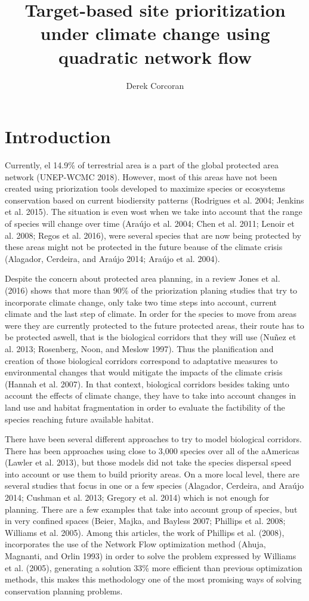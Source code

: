 \documentclass[]{article}
\title{Target-based site prioritization under climate change using quadratic network flow}
\author{Derek Corcoran}
\date{}
\begin{document}
\maketitle

\hypertarget{introduction}{%
\section{Introduction}\label{introduction}}

Currently, el 14.9\% of terrestrial area is a part of the global protected area network (UNEP-WCMC 2018). However, most of this areas have not been created using priorization tools developed to maximize species or ecosystems conservation based on current biodiersity patterns (Rodrigues et al. 2004; Jenkins et al. 2015). The situation is even wost when we take into account that the range of species will change over time (Araújo et al. 2004; Chen et al. 2011; Lenoir et al. 2008; Regos et al. 2016), were several species that are now being protected by these areas might not be protected in the future beause of the climate crisis (Alagador, Cerdeira, and Araújo 2014; Araújo et al. 2004).

Despite the concern about protected area planning, in a review Jones et al. (2016) shows that more than 90\% of the priorization planing studies that try to incorporate climate change, only take two time steps into account, current climate and the last step of climate. In order for the species to move from areas were they are currently protected to the future protected areas, their route has to be protected aswell, that is the biological corridors that they will use (Nuñez et al. 2013; Rosenberg, Noon, and Meslow 1997). Thus the planification and creation of those biological corridors correspond to adaptative measures to environmental changes that would mitigate the impacts of the climate crisis (Hannah et al. 2007). In that context, biological corridors besides taking unto account the effects of climate change, they have to take into account changes in land use and habitat fragmentation in order to evaluate the factibility of the species reaching future available habitat.

There have been several different approaches to try to model biological corridors. There has been approaches using close to 3,000 species over all of the aAmericas (Lawler et al. 2013), but those models did not take the species dispersal speed into account or use them to build priority areas. On a more local level, there are several studies that focus in one or a few species (Alagador, Cerdeira, and Araújo 2014; Cushman et al. 2013; Gregory et al. 2014) which is not enough for planning. There are a few examples that take into account group of species, but in very confined spaces (Beier, Majka, and Bayless 2007; Phillips et al. 2008; Williams et al. 2005). Among this articles, the work of Phillips et al. (2008), incorporates the use of the Network Flow optimization method (Ahuja, Magnanti, and Orlin 1993) in order to solve the problem expressed by Williams et al. (2005), generating a solution 33\% more efficient than previous optimization methods, this makes this methodology one of the most promising ways of solving conservation planning problems.
\end{document}
